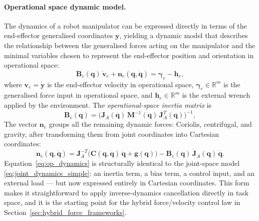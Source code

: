 \documentclass[
	german,%
	accentcolor=9c,%
	ruledheaders=section,%
	class=report,%
	thesis={type=bachelor},%
	fontsize=11pt,%
	parskip=half-,%
	custommargins=true,%
	marginpar=false,%
]{tudapub}
\begin{document}
\paragraph{Operational space dynamic model.}
The dynamics of a robot manipulator can be expressed directly in terms
of the end-effector generalised coordinates $\mathbf{y}$, yielding a dynamic
model that describes the relationship between the generalised forces acting on
the manipulator and the minimal variables chosen to represent the end-effector
position and orientation in operational space:
%
\begin{equation}
    \mathbf{B}_e(\mathbf{q})\,\dot{\mathbf{v}}_e
    + \mathbf{n}_e(\mathbf{q},\dot{\mathbf{q}})
    = \boldsymbol{\gamma}_e - \mathbf{h}_e,
    \label{eq:op_dynamics}
\end{equation}
%
where $\mathbf{v}_e = \dot{\mathbf{y}}$ is the end-effector velocity in
operational space, $\boldsymbol{\gamma}_e \in \mathbb{R}^{m}$ is the
generalised force input in operational space, and
$\mathbf{h}_e \in \mathbb{R}^{m}$ is the external wrench applied by the
environment. The \emph{operational-space inertia matrix} is
%
\begin{equation}
    \mathbf{B}_e(\mathbf{q})
    = \bigl(\mathbf{J}_A(\mathbf{q})\,\mathbf{M}^{-1}(\mathbf{q})\,
             \mathbf{J}_A^T(\mathbf{q})\bigr)^{-1},
    \label{eq:Be}
\end{equation}
%
The vector $\mathbf{n}_e$ groups all the remaining dynamic forces: Coriolis, centrifugal, and gravity, after transforming them from joint coordinates into Cartesian coordinates:
%
\begin{equation}
    \mathbf{n}_e(\mathbf{q},\dot{\mathbf{q}})
    = \mathbf{J}_A^{-T}\!\bigl(\mathbf{C}(\mathbf{q},\dot{\mathbf{q}})\,\dot{\mathbf{q}}
      + \mathbf{g}(\mathbf{q})\bigr)
      - \mathbf{B}_e(\mathbf{q})\,\dot{\mathbf{J}}_A(\mathbf{q})\,\dot{\mathbf{q}}.
    \label{eq:ne}
\end{equation}
%
Equation~\eqref{eq:op_dynamics} is structurally identical to the joint-space
model \eqref{eq:joint_dynamics_simple}: an inertia term, a bias term, a
control input, and an external load — but now expressed entirely in
Cartesian coordinates. This form makes it straightforward to apply
inverse-dynamics cancellation directly in task space, and it is the
starting point for the hybrid force/velocity control law in
Section~\ref{sec:hybrid_force_frameworks}.

\end{document}
